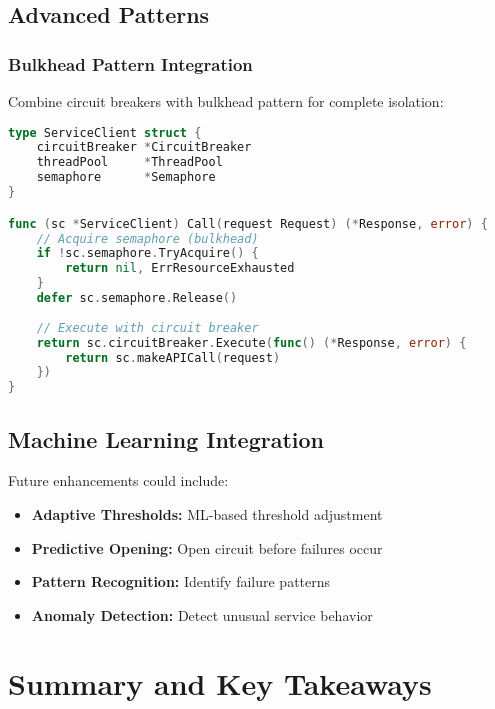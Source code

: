 \documentclass[12pt,a4paper]{article}
\begin{document}
\subsection{Advanced Patterns}

\subsubsection{Bulkhead Pattern Integration}
Combine circuit breakers with bulkhead pattern for complete isolation:

\begin{lstlisting}[language=Go, caption=Bulkhead + Circuit Breaker]
type ServiceClient struct {
    circuitBreaker *CircuitBreaker
    threadPool     *ThreadPool
    semaphore      *Semaphore
}

func (sc *ServiceClient) Call(request Request) (*Response, error) {
    // Acquire semaphore (bulkhead)
    if !sc.semaphore.TryAcquire() {
        return nil, ErrResourceExhausted
    }
    defer sc.semaphore.Release()
    
    // Execute with circuit breaker
    return sc.circuitBreaker.Execute(func() (*Response, error) {
        return sc.makeAPICall(request)
    })
}
\end{lstlisting}

\subsection{Machine Learning Integration}

Future enhancements could include:
\begin{itemize}
    \item \textbf{Adaptive Thresholds:} ML-based threshold adjustment
    \item \textbf{Predictive Opening:} Open circuit before failures occur
    \item \textbf{Pattern Recognition:} Identify failure patterns
    \item \textbf{Anomaly Detection:} Detect unusual service behavior
\end{itemize}

\section{Summary and Key Takeaways}
\end{document}
